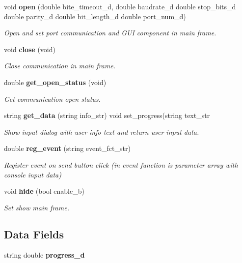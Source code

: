 \begin{DoxyCompactItemize}
void \textbf{ open} (double bite\+\_\+timeout\+\_\+d, double baudrate\+\_\+d double stop\+\_\+bits\+\_\+d double parity\+\_\+d double bit\+\_\+length\+\_\+d double port\+\_\+num\+\_\+d)
\begin{DoxyCompactList}\small\item\em Open and set port communication and G\+UI component in main frame. \end{DoxyCompactList}\item 
void \textbf{ close} (void)
\begin{DoxyCompactList}\small\item\em Close communication in main frame. \end{DoxyCompactList}\item 
double \textbf{ get\+\_\+open\+\_\+status} (void)
\begin{DoxyCompactList}\small\item\em Get communication open status. \end{DoxyCompactList}\item 
string \textbf{ get\+\_\+data} (string info\+\_\+str) void set\+\_\+progress(string text\+\_\+str
\begin{DoxyCompactList}\small\item\em Show input dialog with user info text and return user input data. \end{DoxyCompactList}\item 
double \textbf{ reg\+\_\+event} (string event\+\_\+fct\+\_\+str)
\begin{DoxyCompactList}\small\item\em Register event on send button click (in event function is parameter array with console input data) \end{DoxyCompactList}\item 
void \textbf{ hide} (bool enable\+\_\+b)
\begin{DoxyCompactList}\small\item\em Set show main frame. \end{DoxyCompactList}\end{DoxyCompactItemize}
\subsection*{Data Fields}
\begin{DoxyCompactItemize}
\item 
\mbox{\label{classmain__frame_ad8890da38ee09bca1d0a8e8f5989e6fe}} 
string double {\bfseries progress\+\_\+d}
\end{DoxyCompactItemize}


